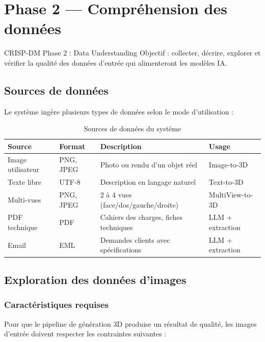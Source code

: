 \documentclass[12pt,a4paper,oneside]{report}
\begin{document}
\chapter{Phase 2 — Compréhension des données}

\begin{crispbox}{CRISP-DM Phase 2 : Data Understanding}
Objectif : collecter, décrire, explorer et vérifier la qualité des données
d'entrée qui alimenteront les modèles IA.
\end{crispbox}

\section{Sources de données}

Le système ingère plusieurs types de données selon le mode d'utilisation :

\begin{table}[H]
\centering
\caption{Sources de données du système}
\label{tab:data-sources}
\begin{tabularx}{\linewidth}{@{}llXl@{}}
\toprule
\textbf{Source} & \textbf{Format} & \textbf{Description} & \textbf{Usage} \\
\midrule
Image utilisateur & PNG, JPEG & Photo ou rendu d'un objet réel & Image-to-3D \\
Texte libre       & UTF-8     & Description en langage naturel   & Text-to-3D \\
Multi-vues        & PNG, JPEG & 2 à 4 vues (face/dos/gauche/droite) & MultiView-to-3D \\
PDF technique     & PDF       & Cahiers des charges, fiches techniques & LLM + extraction \\
Email             & EML       & Demandes clients avec spécifications & LLM + extraction \\
\bottomrule
\end{tabularx}
\end{table}

\section{Exploration des données d'images}

\subsection{Caractéristiques requises}
Pour que le pipeline de génération 3D produise un résultat de qualité, les
images d'entrée doivent respecter les contraintes suivantes :
\end{document}

